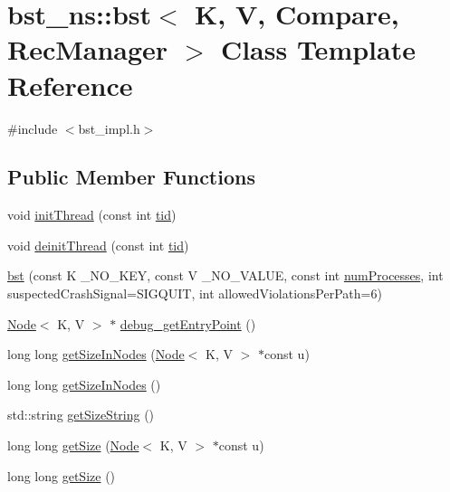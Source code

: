 \hypertarget{classbst__ns_1_1bst}{}\section{bst\+\_\+ns\+:\+:bst$<$ K, V, Compare, Rec\+Manager $>$ Class Template Reference}
\label{classbst__ns_1_1bst}


{\ttfamily \#include $<$bst\+\_\+impl.\+h$>$}

\subsection*{Public Member Functions}
\begin{DoxyCompactItemize}
\item 
void \hyperlink{classbst__ns_1_1bst_a3cfb3ede09f269633f96bb3d83c9b216}{init\+Thread} (const int \hyperlink{microbench_2main_8cpp_a9ca9869868fe7e7a38a921cc7de4103f}{tid})
\item 
void \hyperlink{classbst__ns_1_1bst_a637afb81516af748a18caaf34e20a3b5}{deinit\+Thread} (const int \hyperlink{microbench_2main_8cpp_a9ca9869868fe7e7a38a921cc7de4103f}{tid})
\item 
\hyperlink{classbst__ns_1_1bst_aa917b4d8a64085282bdb6a94282255b1}{bst} (const K \+\_\+\+N\+O\+\_\+\+K\+EY, const V \+\_\+\+N\+O\+\_\+\+V\+A\+L\+UE, const int \hyperlink{testing_8cpp_aa085812188e21ede75351d88b9b2c30d}{num\+Processes}, int suspected\+Crash\+Signal=S\+I\+G\+Q\+U\+IT, int allowed\+Violations\+Per\+Path=6)
\item 
\hyperlink{classbst__ns_1_1Node}{Node}$<$ K, V $>$ $\ast$ \hyperlink{classbst__ns_1_1bst_a037981db7b5b0451d9d429fbffb51209}{debug\+\_\+get\+Entry\+Point} ()
\item 
long long \hyperlink{classbst__ns_1_1bst_adf543c23e8a49408bb85f9421a4bcef8}{get\+Size\+In\+Nodes} (\hyperlink{classbst__ns_1_1Node}{Node}$<$ K, V $>$ $\ast$const u)
\item 
long long \hyperlink{classbst__ns_1_1bst_aa9e0e2565d7d7d11ac3c64dd5c1df6ad}{get\+Size\+In\+Nodes} ()
\item 
std\+::string \hyperlink{classbst__ns_1_1bst_adb0dbcb9e07a12a10bd63ba3a7d7673a}{get\+Size\+String} ()
\item 
long long \hyperlink{classbst__ns_1_1bst_a08b4846a99c3ee33d5030d7b0edad9b7}{get\+Size} (\hyperlink{classbst__ns_1_1Node}{Node}$<$ K, V $>$ $\ast$const u)
\item 
long long \hyperlink{classbst__ns_1_1bst_aebafe1df3868581c45cc7ea3a418ba55}{get\+Size} ()

\end{DoxyCompactItemize}
